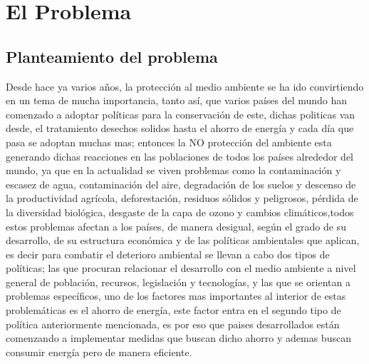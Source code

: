 \documentclass[12pt,letterpaper]{report}
\begin{document}
\chapter{El Problema}
\section{Planteamiento del problema}
Desde hace ya varios años, la protección al medio ambiente se ha ido convirtiendo en un tema de mucha importancia,
tanto así, que varios países del mundo han comenzado a adoptar políticas para la conservación de este, dichas politicas van desde, el tratamiento desechos solidos hasta el ahorro de energía y cada día que pasa se adoptan muchas mas; entonces la NO protección del ambiente esta generando dichas reacciones en las poblaciones de todos los países alrededor del mundo, ya que en la actualidad se viven problemas como la contaminación y escasez de agua, contaminación del aire, degradación de los suelos y descenso de la productividad agrícola, deforestación, residuos sólidos y peligrosos, pérdida de la diversidad biológica, desgaste de la capa de ozono y cambios climáticos,todos estos problemas afectan a los países, de manera desigual, según el grado de su desarrollo, de su estructura económica y de las políticas ambientales que aplican, es decir para combatir el deterioro ambiental se llevan a cabo dos tipos de políticas; las que procuran relacionar el desarrollo con el medio ambiente a nivel general de población, recursos, legislación y tecnologías, y las que se orientan a problemas específicos, uno de los factores mas importantes al interior de estas problemáticas es el ahorro de energía, este factor entra en el segundo tipo de política anteriormente mencionada, es por eso que paises desarrollados están comenzando a implementar medidas que buscan dicho ahorro y ademas buscan consumir energía pero de manera eficiente.
\end{document}
